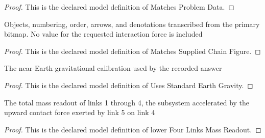 \begin{proof}
  This is the declared model definition of Matches Problem Data.
\end{proof}
\begin{definition}
  \label{def:physics:phyx-mini-0761:phyxminiproblems-problemphyxmini0761-matchessuppliedchainfigure}
  Objects, numbering, order, arrows, and denotations transcribed from the primary bitmap. No value for the requested interaction force is included
\end{definition}
\begin{proof}
  This is the declared model definition of Matches Supplied Chain Figure.
\end{proof}
\begin{definition}
  \label{def:physics:phyx-mini-0761:phyxminiproblems-problemphyxmini0761-usesstandardearthgravity}
  The near-Earth gravitational calibration used by the recorded answer
\end{definition}
\begin{proof}
  This is the declared model definition of Uses Standard Earth Gravity.
\end{proof}
\begin{definition}
  \label{def:physics:phyx-mini-0761:phyxminiproblems-problemphyxmini0761-lowerfourlinksmassreadout}
  The total mass readout of links 1 through 4, the subsystem accelerated by the upward contact force exerted by link 5 on link 4
\end{definition}
\begin{proof}
  This is the declared model definition of lower Four Links Mass Readout.
\end{proof}
